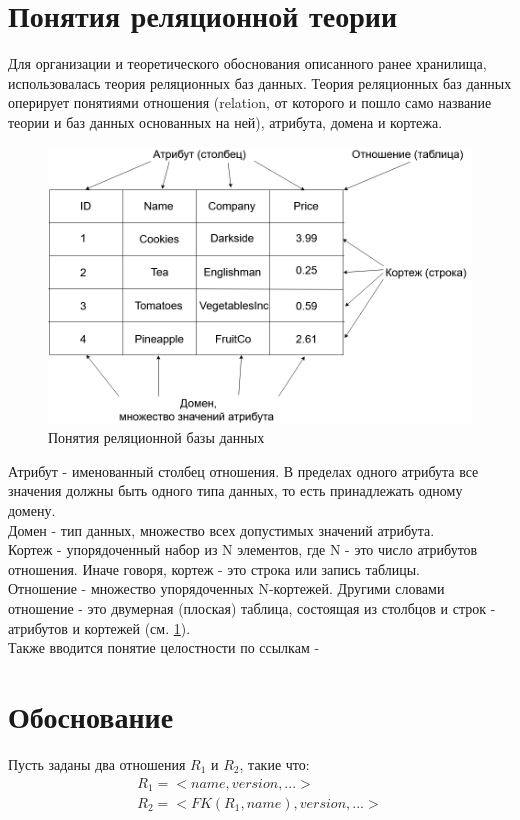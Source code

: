 \section{Понятия реляционной теории}
\indent Для организации и теоретического обоснования описанного ранее хранилища, использовалась теория реляционных баз данных.
\indent Теория реляционных баз данных оперирует понятиями отношения (relation, от которого и пошло само название теории и баз данных основанных на ней), атрибута, домена и кортежа.

\begin{figure}[ht]
	\centering
	\includegraphics[width=\linewidth]{pics/databaseExample.png}
	\caption{Понятия реляционной базы данных}
	\label{fig:dbExample}
\end{figure}

\indent Атрибут - именованный столбец отношения.
В пределах одного атрибута все значения должны быть одного типа данных, то есть принадлежать одному домену.\\
\indent Домен - тип данных, множество всех допустимых значений атрибута.\\
\indent Кортеж - упорядоченный набор из N элементов, где N - это число атрибутов отношения.
Иначе говоря, кортеж - это строка или запись таблицы.\\
\indent Отношение - множество упорядоченных N-кортежей.
Другими словами отношение - это двумерная (плоская) таблица, состоящая из столбцов и строк - атрибутов и кортежей (см. \ref{fig:dbExample}).\\
\indent Также вводится понятие целостности по ссылкам - 

\section{Обоснование}
\indent Пусть заданы два отношения $R_1$ и $R_2$, такие что:
\begin{multline*}
		R_1 = <name, version, ...>\\
		R_2 = <FK(R_1, name), version, ...>
\end{multline*}

